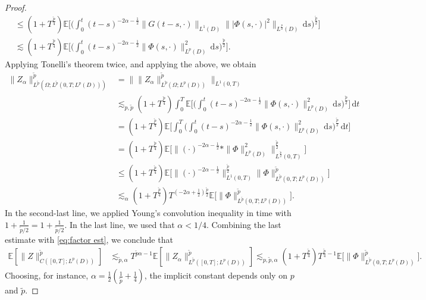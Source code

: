 \documentclass{amsart}
\theoremstyle{plain}
\theoremstyle{remark}
\theoremstyle{plain}
\numberwithin{equation}{section}
\newcommand{\E}{{\mathbb E}}
\newcommand{\Om}{\Omega}
\newcommand{\dd}{\,\mathrm{d}}
\begin{document}
\begin{proof}
\begin{align*}
&\leq (1+T^{\frac{\tilde p}{4}})\E\bigg[\Big(  \int_0^t (t-s)^{-2\alpha-\frac12}\big\|G (t-s,\cdot)\|_{L^1(D)}\||\Phi(s,\cdot)|^2 \|_{L^{\frac{p}{2}}(D)} \dd s \Big)^{\frac{\tilde p}{2}} \bigg]\\
&\lesssim (1+T^{\frac{\tilde p}{4}})\E\bigg[\Big(  \int_0^t (t-s)^{-2\alpha-\frac12} \|\Phi(s,\cdot) \|_{L^{p}(D)}^2 \dd s \Big)^{\frac{\tilde p}{2}} \bigg].
\end{align*}  
Applying  Tonelli's theorem twice, and applying the above, we obtain
\begin{align*}
    \| Z_\alpha\|_{L^{\tilde p}(\Om ;L^{{\tilde p}}(0,T;L^p(D)))}^{{\tilde p}} &= \| \|Z_\alpha \|_{L^{\tilde p}(\Om;L^p(D))}^{\tilde p}\|_{L^{1}(0,T)} \\
    &\lesssim_{p, \tilde p }(1+T^{\frac{\tilde p}{4}}) \int_0^T  \E\bigg[\Big(  \int_0^t (t-s)^{-2\alpha-\frac12} \|\Phi(s,\cdot) \|_{L^{p}(D)}^2 \dd s \Big)^{\frac{\tilde p}{2}} \bigg] \dd t\\
    &= (1+T^{\frac{\tilde p}{4}}) \E\bigg[\int_0^T\Big(  \int_0^t (t-s)^{-2\alpha-\frac12} \|\Phi(s,\cdot) \|_{L^{p}(D)}^2 \dd s \Big)^{\frac{\tilde p}{2}}\dd t \bigg] \\
    &= (1+T^{\frac{\tilde p}{4}})\E\Big[\big\| (\cdot)^{-2\alpha-\frac12}* \|\Phi \|_{L^{p}(D)}^2 \big\|_{L^{\frac{\tilde p}{2}}(0,T)}^ {\frac{\tilde p}{2}}\Big]\\
    &\leq(1+T^{\frac{\tilde p}{4}}) \E\big[ \|(\cdot)^{-2\alpha-\frac12}\|_{L^1(0,T)}^{\frac{\tilde p}{2}} \|\Phi \|_{L^{ {\tilde p} }(0,T;L^p(D))}^{\tilde p }\big]\\
    &\lesssim_\alpha(1+T^{\frac{\tilde p}{4}}) T^{(-2\alpha+\frac12)\frac{\tilde p}{2}}\E\big[\|\Phi \|_{L^{\tilde p}(0,T;L^p(D))}^{\tilde p}\big].
\end{align*}  
In the second-last line, we applied Young's convolution inequality in time with $1+\frac{1}{\tilde p/2}=1+\frac{1}{\tilde p/2}$. In the last line, we used that $\alpha<1/4$. 
Combining the last estimate with \eqref{eq:factor est}, we conclude that
\begin{align*}
\E[\|Z\|_{C([0,T];L^p(D))}^{\tilde p}]
&\lesssim_{\tilde p,\alpha} T^{\tilde p \alpha-1}\E[\|Z_\alpha\|_{L^{\tilde p}([0,T];L^p(D))}^{\tilde p}]
\lesssim_{p,\tilde p,\alpha} (1+T^{\frac{\tilde p}{4}})T^{ \frac{\tilde p}{4}-1}\E\big[\|\Phi \|_{L^{\tilde p}(0,T;L^p(D))}^{\tilde p}\big].
\end{align*}
Choosing, for instance, $\alpha=\frac12(\frac{1}{\tilde p}+\frac14)$, the implicit constant depends only on $p$ and $\tilde p$. 
\end{proof}
\end{document}
